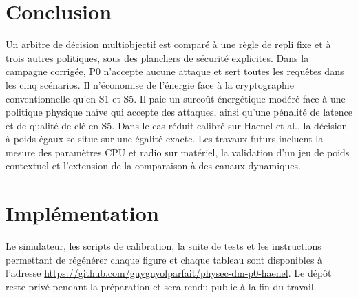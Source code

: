 \documentclass[conference]{IEEEtran}
\begin{document}
\section{Conclusion}

Un arbitre de décision multiobjectif est comparé à une règle de repli fixe et à trois autres politiques, sous des planchers de sécurité explicites. Dans la campagne corrigée, P0 n'accepte aucune attaque et sert toutes les requêtes dans les cinq scénarios. Il n'économise de l'énergie face à la cryptographie conventionnelle qu'en S1 et S5. Il paie un surcoût énergétique modéré face à une politique physique naïve qui accepte des attaques, ainsi qu'une pénalité de latence et de qualité de clé en S5. Dans le cas réduit calibré sur Haenel et al., la décision à poids égaux se situe sur une égalité exacte. Les travaux futurs incluent la mesure des paramètres CPU et radio sur matériel, la validation d'un jeu de poids contextuel et l'extension de la comparaison à des canaux dynamiques.

\section{Implémentation}

Le simulateur, les scripts de calibration, la suite de tests et les instructions permettant de régénérer chaque figure et chaque tableau sont disponibles à l'adresse \url{https://github.com/guygnyolparfait/physec-dm-p0-haenel}. Le dépôt reste privé pendant la préparation et sera rendu public à la fin du travail.
\end{document}
